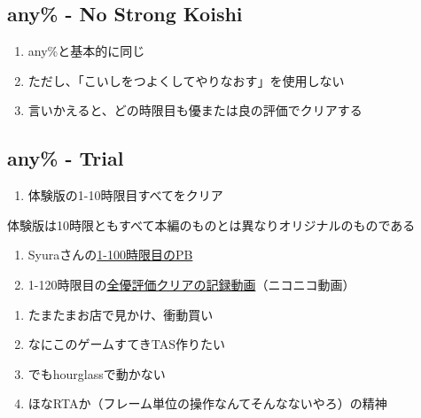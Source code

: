 \subsection{any\% - No Strong Koishi}
\begin{enumerate}[label={\sarrow}]
\item any\%と基本的に同じ
\item ただし、「こいしをつよくしてやりなおす」を使用しない
\item 言いかえると、どの時限目も優または良の評価でクリアする
\end{enumerate}


\subsection{any\% - Trial}
\begin{enumerate}[label={\sarrow}]
\item 体験版の1-10時限目すべてをクリア
\end{enumerate}
\begin{marker}
体験版は10時限ともすべて本編のものとは異なりオリジナルのものである
\end{marker}



\begin{enumerate}[label={\sarrow}]
\item Syuraさんの\href{https://pastebin.com/0nH3mJSZ}{1-100時限目のPB}
\item 1-120時限目の\href{https://www.nicovideo.jp/watch/sm18710850}{全優評価クリアの記録動画}（ニコニコ動画）
\end{enumerate}



\clearpage
\begin{enumerate}[label={\sarrow}]
\item たまたまお店で見かけ、衝動買い
\item なにこのゲームすてきTAS作りたい
\item でもhourglassで動かない
\item ほなRTAか（フレーム単位の操作なんてそんなないやろ）の精神
\end{enumerate}

